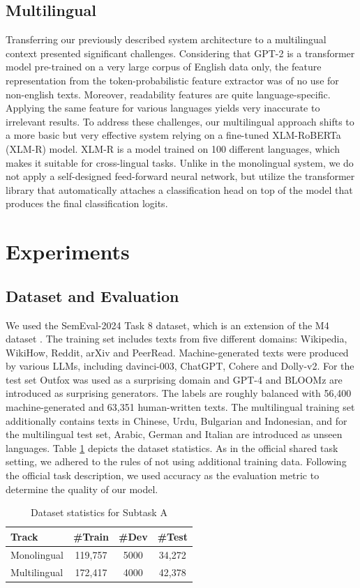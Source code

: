 \documentclass[11pt]{article}
\begin{document}
\subsection{Multilingual}
Transferring our previously described system architecture to a multilingual context presented significant challenges. 
Considering that GPT-2 is a transformer model pre-trained on a very large corpus of English data only, the feature 
representation from the token-probabilistic feature extractor was of no use for non-english texts.  
Moreover, readability features are quite language-specific. Applying the same feature for various languages yields very 
inaccurate to irrelevant results. 
To address these challenges, our multilingual approach shifts to a more basic but very effective system relying on a 
fine-tuned XLM-RoBERTa (XLM-R) model. XLM-R is a model trained on 100 different languages, which makes it suitable for 
cross-lingual tasks. Unlike in the monolingual system, we do not apply a self-designed feed-forward neural network, but utilize the transformer library 
that automatically attaches a classification head on top of the model that produces the final classification logits. 

\section{Experiments}
\subsection{Dataset and Evaluation}
We used the SemEval-2024 Task 8 dataset, which is an extension of the M4 dataset \cite{wang2023m4}. 
The training set includes texts from five different domains: Wikipedia, WikiHow, Reddit, arXiv and PeerRead. Machine-generated 
texts were produced by various LLMs, including davinci-003, ChatGPT, Cohere and Dolly-v2. For the test set 
Outfox was used as a surprising domain and GPT-4 and BLOOMz are introduced as surprising generators. The 
labels are roughly balanced with 56,400 machine-generated and 63,351 human-written texts.  
The multilingual training set additionally contains texts in Chinese, Urdu, Bulgarian and Indonesian, and 
for the multilingual test set, Arabic, German and Italian are introduced as unseen languages. 
Table \ref{tab:Dataset} depicts the dataset statistics. 
As in the official shared task setting, we adhered to the rules of not using additional training data. Following the official task description, we used accuracy as the 
evaluation metric to determine the quality of our model.
\begin{table}[ht]
    \centering
    \begin{tabular}{|l|c|c|c|}
    \hline
    \textbf{Track} & \textbf{\#Train} & \textbf{\#Dev} & \textbf{\#Test} \\
    \hline
    Monolingual & 119,757 & 5000 & 34,272 \\
    \hline
    Multilingual & 172,417 & 4000 & 42,378 \\
    \hline
    \end{tabular}
    \caption{Dataset statistics for Subtask A}
    \label{tab:Dataset}
\end{table}
\end{document}
